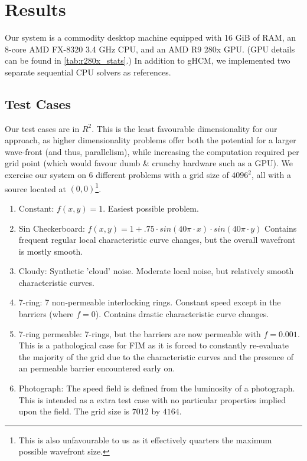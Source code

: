 \documentclass[11pt]{article}       %
\begin{document}

\section{Results} \label{sec:results}

Our system is a commodity desktop machine equipped with 16 GiB of RAM, an 8-core AMD FX-8320 3.4 GHz CPU, and an AMD R9 280x GPU. (GPU details can be found in \autoref{tab:r280x_stats}.) In addition to gHCM, we implemented two separate sequential CPU solvers as references.


\subsection{Test Cases} \label{sec:test_cases}

Our test cases are in $R^2$. This is the least favourable dimensionality for our approach, as higher dimensionality problems offer both the potential for a larger wave-front (and thus, parallelism), while increasing the computation required per grid point (which would favour dumb \& crunchy hardware such as a GPU). We exercise our system on 6 different problems with a grid size of $4096^2$, all with a source located at $(0, 0)$\footnote{This is also unfavourable to us as it effectively quarters the maximum possible wavefront size.}.

\begin{enumerate}[noitemsep]
\item Constant: $f(x, y) = 1$. Easiest possible problem.
\item Sin Checkerboard: $f(x, y) = 1 + .75 \cdot sin(40\pi \cdot x) \cdot sin(40\pi \cdot y)$ Contains frequent regular local characteristic curve changes, but the overall wavefront is mostly smooth.
\item Cloudy: Synthetic 'cloud' noise. Moderate local noise, but relatively smooth characteristic curves.
\item 7-ring: 7 non-permeable interlocking rings. Constant speed except in the barriers (where $f = 0$). Contains drastic characteristic curve changes.
\item 7-ring permeable: 7-rings, but the barriers are now permeable with $f = 0.001$. This is a pathological case for FIM as it is forced to constantly re-evaluate the majority of the grid due to the characteristic curves and the presence of an permeable barrier encountered early on.
\item Photograph: The speed field is defined from the luminosity of a photograph. This is intended as a extra test case with no particular properties implied upon the field. The grid size is $7012$ by $4164$.
\end{enumerate}
\end{document}

